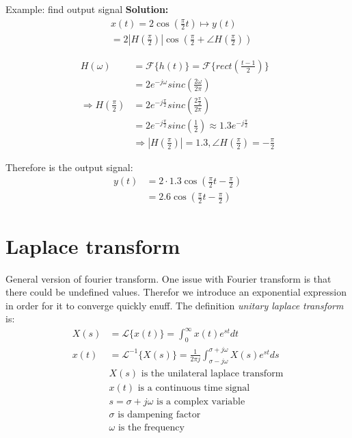 \begin{multicols}{2}
\begin{exampleblock}{Example: find output signal}
    \textbf{Solution:}
    \begin{align*}
        &x(t)=2\cos\left(\frac{\pi}{2}t\right) \mapsto y(t) \\
        &=2|H\left(\frac{\pi}{2}\right)|\cos\left(\frac{\pi}{2}+\angle H\left(\frac{\pi}{2}\right)\right)
    \end{align*}

    \begin{align*}
        H(\omega) &= \mathcal{F}\{ h(t) \} = \mathcal{F}\{ rect\left(\frac{t-1}{2}\right) \} \\
        &=2e^{-j\omega}sinc\left(\frac{2\omega}{2\pi}\right) \\
        \Rightarrow H\left(\frac{\pi}{2}\right) &= 2e^{-j\frac{\pi}{2}}sinc\left(\frac{2\frac{\pi}{2}}{2\pi}\right) \\
        &= 2e^{-j\frac{\pi}{2}}sinc\left(\frac{1}{2}\right) \approx 1.3e^{-j\frac{\pi}{2}} \\
        &\Rightarrow |H\left(\frac{\pi}{2}\right)|=1.3, \angle H\left(\frac{\pi}{2}\right) = -\frac{\pi}{2}
    \end{align*}

    Therefore is the output signal:
    \begin{align*}
        y(t) &= 2\cdot 1.3\cos\left(\frac{\pi}{2}t-\frac{\pi}{2}\right) \\
        &= 2.6 \cos\left(\frac{\pi}{2}t-\frac{\pi}{2}\right)
    \end{align*}
\end{exampleblock}


\section{Laplace transform}
General version of fourier transform. One issue with Fourier transform is that there 
could be undefined values. Therefor we introduce an exponential expression in order 
for it to converge quickly enuff. The definition \textit{unitary laplace transform} is:
\begin{align*}
    X(s) &= \mathcal{L}\{ x(t) \} = \int_{0}^{\infty} x(t)e^{st}dt \\
    x(t) &= \mathcal{L}^{-1}\{ X(s) \} = \frac{1}{2\pi j}\int_{\sigma-j\omega}^{\sigma+j\omega} X(s)e^{st}ds \\
    &\text{$X(s)$ is the unilateral laplace transform} \\
    &\text{$x(t)$ is a continuous time signal} \\
    &\text{$s=\sigma+j\omega$ is a complex variable} \\
    &\text{$\sigma$ is dampening factor} \\
    &\text{$\omega$ is the frequency} \\
\end{align*}


\end{multicols}

